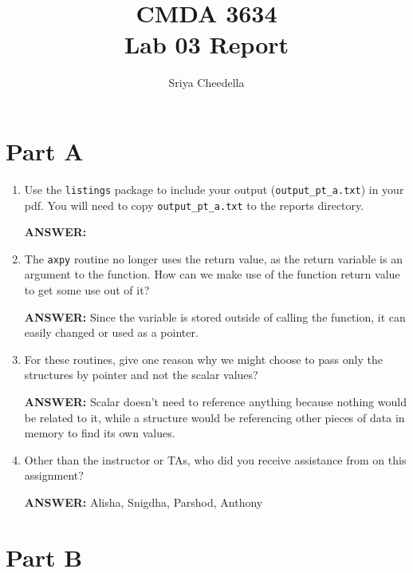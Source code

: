 \documentclass[letter]{article}
\title{CMDA 3634 \\ Lab 03 Report}
\author{Sriya Cheedella}
\begin{document}
\maketitle

\section*{Part A}

\begin{enumerate}
    \item Use the \texttt{listings} package to include your output (\texttt{output\_pt\_a.txt}) in your pdf.  You will need to copy \texttt{output\_pt\_a.txt} to the reports directory.
    
    \textbf{ANSWER:} 


    \item The \texttt{axpy} routine no longer uses the return value, as the return variable is an argument to the function.  How can we make use of the function return value to get some use out of it?

    \textbf{ANSWER:} Since the variable is stored outside of calling the function, it can easily changed or used as a pointer.

    \item For these routines, give one reason why we might choose to pass only the structures by pointer and not the scalar values?
    
    \textbf{ANSWER:} Scalar doesn't need to reference anything because nothing would be related to it, while a structure would be referencing other pieces of data in memory to find its own values.

    \item Other than the instructor or TAs, who did you receive assistance from on this assignment?
    
    \textbf{ANSWER:} Alisha, Snigdha, Parshod, Anthony
\end{enumerate}

\section*{Part B}





\end{document}
